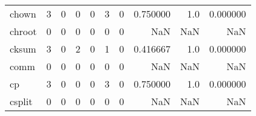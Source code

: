\begin{tabular}{lrrrrrrrrr}
chown     &                                       3 &                                                  0 &                                                  0 &                                                  0 &                                                  3 &                                                  0 &                                           0.750000 &                                    1.0 &                             0.000000 \\
chroot    &                                       0 &                                                  0 &                                                  0 &                                                  0 &                                                  0 &                                                  0 &                                                NaN &                                    NaN &                                  NaN \\
cksum     &                                       3 &                                                  0 &                                                  2 &                                                  0 &                                                  1 &                                                  0 &                                           0.416667 &                                    1.0 &                             0.000000 \\
comm      &                                       0 &                                                  0 &                                                  0 &                                                  0 &                                                  0 &                                                  0 &                                                NaN &                                    NaN &                                  NaN \\
cp        &                                       3 &                                                  0 &                                                  0 &                                                  0 &                                                  3 &                                                  0 &                                           0.750000 &                                    1.0 &                             0.000000 \\
csplit    &                                       0 &                                                  0 &                                                  0 &                                                  0 &                                                  0 &                                                  0 &                                                NaN &                                    NaN &                                  NaN \\

\end{tabular}
